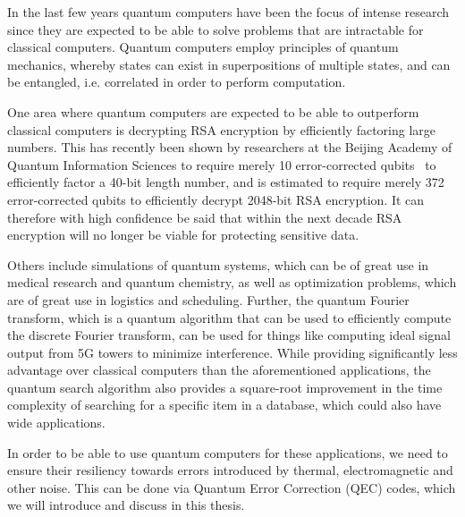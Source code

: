 In the last few years quantum computers have been the focus of intense research
since they are expected to be able to solve problems that are intractable for
classical computers. 
Quantum computers employ principles of quantum mechanics, whereby states can exist
in superpositions of multiple states, and can be entangled, i.e. correlated
in order to perform computation.

One area where quantum computers are expected to be able to outperform classical
computers is decrypting RSA encryption by efficiently factoring large 
numbers. 
This has recently been shown by researchers at the Beijing
Academy of Quantum Information Sciences to require merely 10 error-corrected
 qubits~\cite{beijing} to efficiently factor a 40-bit length number,
and is estimated to require merely 372 error-corrected qubits to efficiently decrypt
2048-bit RSA encryption.
It can therefore with high confidence be said that within the next decade
RSA encryption will no longer be viable for protecting sensitive data.

Others include simulations of quantum systems, which can be of great use in
medical research and quantum chemistry, as well as optimization problems, which
are of great use in logistics and scheduling.
Further, the quantum Fourier transform, which is a quantum algorithm that
can be used to efficiently compute the discrete Fourier transform, can be used for 
things like computing ideal signal output from 5G towers to minimize interference.
While providing significantly less advantage over classical computers than the 
aforementioned applications, the quantum search algorithm also provides a 
square-root improvement in the time complexity of searching for a specific item in 
a database, which could also have wide applications.

In order to be able to use quantum computers for these applications, we need to
ensure their resiliency towards errors introduced by thermal, electromagnetic and 
other noise. 
This can be done via Quantum Error Correction (QEC) codes, which we will introduce
and discuss in this thesis.
